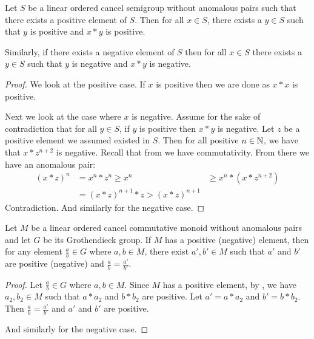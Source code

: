 \begin{theorem}\label{pos_large_elements}
    \leanok
    Let $S$ be a linear ordered cancel semigroup without anomalous pairs
    such that there exists a positive element of $S$.
    Then for all $x \in S$, there exists a $y \in S$
    such that $y$ is positive and $x*y$ is positive.

    Similarly, if there exists a negative element of $S$
    then for all $x \in S$ there exists a $y \in S$
    such that $y$ is negative and $x*y$ is negative.
\end{theorem}
\begin{proof}\leanok
We look at the positive case. If $x$ is positive then
we are done as $x*x$ is positive.

Next we look at the case where $x$ is negative.
Assume for the sake of contradiction that for all $y \in S$,
if $y$ is positive then $x*y$ is negative. Let $z$
be a positive element we assumed existed in $S$.
Then for all positive $n \in \mathbb{N}$, we have that
$x * z^{n+2}$ is negative. 
Recall that from  we have
commutativity.
From there we have an anomalous pair:
\begin{align*}
(x * z)^n &= x^n * z^n \ge x^n
&\ge x^n * (x * z^{n+2})\\
&= (x * z)^{n+1} * z > (x*z)^{n+1}
\end{align*}
Contradiction. And similarly for the negative case.
\end{proof}

\begin{theorem}\label{not_anom_pos_pair}
    \leanok
    Let $M$ be a linear ordered cancel commutative monoid
    without anomalous pairs and let $G$ be its Grothendieck group.
    If $M$ has a positive (negative) element, then
    for any element $\frac{a}{b} \in G$ where $a,b \in M$,
    there exist $a', b' \in M$ such that $a'$ and $b'$ are positive (negative)
    and $\frac{a}{b} = \frac{a'}{b'}$.
\end{theorem}
\begin{proof}\leanok
Let $\frac{a}{b}\in G$ where $a,b\in M$.
Since $M$ has a positive element, by ,
we have $a_2, b_2\in M$ such that $a*a_2$ and $b*b_2$ are positive.
Let $a' = a*a_2$ and $b' = b*b_2$. Then $\frac{a}{b} = \frac{a'}{b'}$
and $a'$ and $b'$ are positive.

And similarly for the negative case.
\end{proof}


